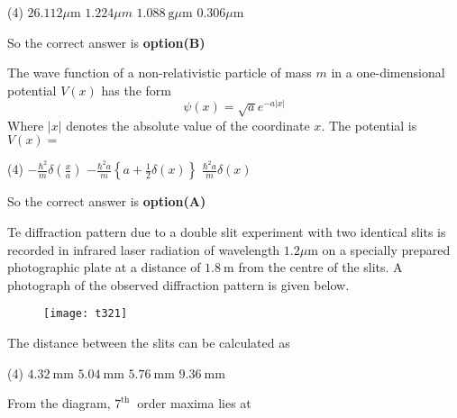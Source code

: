 \begin{questions}
\begin{minipage}{\textwidth}
\end{minipage}
\begin{tasks}(4)
	\task[\textbf{A.}] $26.112 \mu \mathrm{m}$
	\task[\textbf{B.}] $1.224 \mu m$
	\task[\textbf{C.}] $1.088 \mathrm{~g} \mu \mathrm{m}$
	\task[\textbf{D.}] $0.306 \mu \mathrm{m}$
\end{tasks}
\begin{answer}
	So the correct answer is \textbf{option(B)}
\end{answer}
\begin{minipage}{\textwidth}
	\question The wave function of a non-relativistic particle of mass $m$ in a one-dimensional potential $V(x)$ has the form
	$$
	\psi(x)=\sqrt{a} e^{-a|x|}
	$$
	Where $|x|$ denotes the absolute value of the coordinate $x .$ The potential is $V(x)=$
\end{minipage}
\begin{tasks}(4)
	\task[\textbf{A.}] $-\frac{\hbar^{2}}{m} \delta\left(\frac{x}{a}\right)$
	\task[\textbf{B.}]   $-\frac{\hbar^{2} a}{m}\left\{a+\frac{1}{2} \delta(x)\right\}$
	\task[\textbf{C.}] $\frac{\hbar^{2} a}{m} \delta(x)$
\end{tasks}
\begin{answer}
	So the correct answer is \textbf{option(A)}
\end{answer}
\begin{minipage}{\textwidth}
	\question Te diffraction pattern due to a double slit experiment with two identical slits is recorded in infrared laser radiation of wavelength $1.2 \mu \mathrm{m}$ on a specially prepared photographic plate at a distance of $1.8 \mathrm{~m}$ from the centre of the slits. A photograph of the observed diffraction pattern is given below.\\
	\begin{figure}[H]
		\centering
		\texttt{[image: t321]}
	\end{figure}
	The distance between the slits can be calculated as
\end{minipage}
\begin{tasks}(4)
	\task[\textbf{A.}]   $4.32 \mathrm{~mm}$
	\task[\textbf{B.}] $5.04 \mathrm{~mm}$
	\task[\textbf{C.}] $5.76 \mathrm{~mm}$
	\task[\textbf{D.}] $9.36 \mathrm{~mm}$
\end{tasks}
\begin{answer}
	From the diagram, $7^{\text {th }}$ order maxima lies at
	$$
	\begin{aligned}

\end{aligned}$$
\end{answer}
\end{questions}
